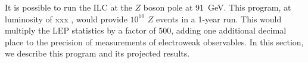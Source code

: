 

It is possible to run the ILC at the $Z$ boson pole at 91~GeV.   This
program, at luminosity of  xxx , would provide  $10^{10}$ $Z$ events
in a 1-year run.   This would multiply the LEP statistics by a factor
of 500, adding one additional decimal place to the precision of
measurements of electroweak observables.  In this section, we describe
this program and its projected results. 


